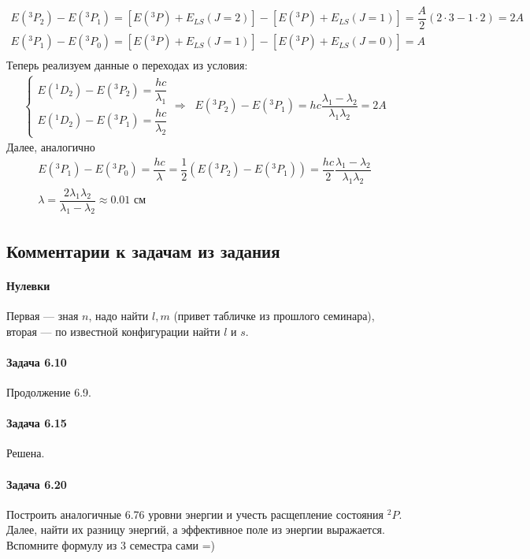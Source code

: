 \documentclass[12pt]{article}
\begin{document}
\begin{gather*}
    E({}^3P_2) - E({}^3P_1) = [E({}^3P)+E_{LS}(J=2)] - [E({}^3P)+E_{LS}(J=1)] = \dfrac{A}{2}(2\cdot 3 - 1\cdot2)= 2A\\
    E({}^3P_1) - E({}^3P_0) = [E({}^3P)+E_{LS}(J=1)] - [E({}^3P)+E_{LS}(J=0)] = A\\
\end{gather*}
Теперь реализуем данные о переходах из условия:
\begin{gather*}
\begin{cases}
    E({}^1D_2) - E({}^3P_2) = \dfrac{hc}{\lambda_1}\\
    E({}^1D_2) - E({}^3P_1) = \dfrac{hc}{\lambda_2}
\end{cases}
\Rightarrow \;\; E({}^3P_2) - E({}^3P_1)= hc \dfrac{\lambda_1-\lambda_2}{\lambda_1\lambda_2} = 2A
\end{gather*}
Далее, аналогично 
\begin{gather*}
E({}^3P_1) - E({}^3P_0) = \dfrac{hc}{\lambda} = \dfrac{1}{2}(E({}^3P_2) - E({}^3P_1))= \dfrac{hc}{2} \dfrac{\lambda_1-\lambda_2}{\lambda_1\lambda_2}\\
\lambda = \dfrac{2\lambda_1\lambda_2}{\lambda_1-\lambda_2} \approx 0.01 \text{ см}
\end{gather*}

\subsection{Комментарии к задачам из задания}
\paragraph{Нулевки}  Первая --- зная $n$, надо найти $l, m$ (привет табличке из прошлого семинара), вторая --- по известной конфигурации найти $l$ и $s$.
\paragraph{Задача 6.10} Продолжение 6.9.
\paragraph{Задача 6.15} Решена.
\paragraph{Задача 6.20} Построить аналогичные 6.76 уровни энергии и учесть расщепление состояния $^2P$. Далее, найти их разницу энергий, а эффективное поле из энергии выражается. Вспомните формулу из 3 семестра сами =)
\end{document}
